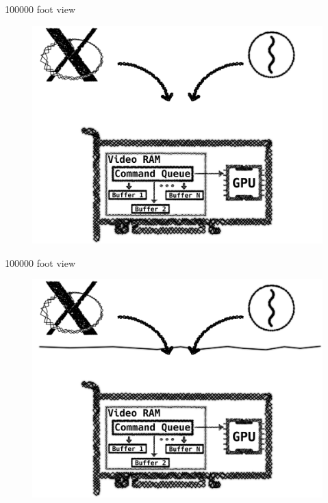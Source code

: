 \documentclass[10pt, compress, aspectratio=169]{beamer}
\begin{document}
\begin{frame}{100000 foot view}
  \begin{figure}
    \centering
    \includegraphics[width=\linewidth,
                     height=0.8\textheight,
                     keepaspectratio]{with_drm_2}
  \end{figure}
\end{frame}

\begin{frame}{100000 foot view}
  \begin{figure}
    \centering
    \includegraphics[width=\linewidth,
                     height=0.8\textheight,
                     keepaspectratio]{with_drm_3}
  \end{figure}
\end{frame}
\end{document}
